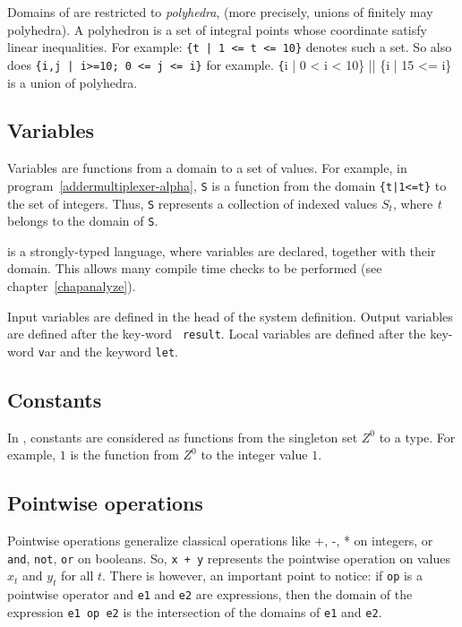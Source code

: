Domains of {\alfa} are restricted to {\em polyhedra}, (more precisely,
unions of finitely may polyhedra).  A polyhedron is a set of integral
points whose coordinate satisfy linear inequalities.  For example:
{\tt \{t | 1 <= t <= 10\}} denotes such a set. So also does {\tt \{i,j
| i>=10; 0 <= j <= i\}} for example. {\texttt \{i | 0 < i < 10\} ||
\{i | 15 <= i\}} is a union of polyhedra.  

\subsection{Variables}
Variables are functions from a domain to a set of values. For example, 
in program~\ref{addermultiplexer-alpha}, {\tt S} is a function from 
the domain {\tt \{t|1<=t\}} to the set of integers. Thus, {\tt S}
represents a collection of indexed values $S_t$, where {\it t} belongs
to the domain of {\tt S}. 

{\alfa} is a strongly-typed language, where variables are declared,
together with their domain. This allows many compile time checks to be
performed (see chapter~\ref{chapanalyze}).

Input variables are defined in the head of the system
definition. Output variables are defined after the key-word {\tt
result}. Local variables are defined after the key-word {\texttt var}
and the keyword {\tt let}.

\subsection{Constants}
In {\alfa}, constants are considered as functions from the
singleton set $Z^0$ to a type. For example, $1$ is the function 
from $Z^0$ to the integer value $1$. 
\subsection{Pointwise operations}

Pointwise operations generalize classical operations like +, -, * on
integers, or {\tt and}, {\tt not}, {\tt or} on booleans. So, {\tt x +
y} represents the pointwise operation on values $x_t$ and $y_t$ for
all $t$. There is however, an important point to notice: if {\tt op}
is a pointwise operator and {\tt e1} and {\tt e2} are expressions,
then the domain of the expression {\tt e1 op e2} is the {intersection}
of the domains of {\tt e1} and {\tt e2}.

